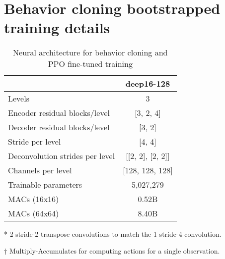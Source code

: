 \documentclass{article}
\begin{document}
\section{Behavior cloning bootstrapped training details}
\begin{table}[H]
    \centering
    \begin{threeparttable}
    \caption{Neural architecture for behavior cloning and PPO fine-tuned training}
    \label{tab:bc-architecture}
    \begin{tabular}{lc}
    \toprule
                                 & deep16-128 \\
    \midrule
    Levels                      & 3  \\
    Encoder residual blocks/level & [3, 2, 4] \\
    Decoder residual blocks/level & [3, 2] \\
    Stride per level            & [4, 4] \\
    Deconvolution strides per level & [[2, 2], [2, 2]]\tnote{*}\\
    Channels per level          & [128, 128, 128] \\
    Trainable parameters        & 5,027,279 \\
    MACs\tnote{†} (16x16)          & 0.52B \\
    MACs\tnote{†} (64x64)          & 8.40B \\
    \bottomrule
    \end{tabular}
    \begin{tablenotes}
       \item[*] 2 stride-2 transpose convolutions to match the 1 stride-4 convolution.
       \item[†] Multiply-Accumulates for computing actions for a single observation.
    \end{tablenotes}
    \end{threeparttable}
\end{table}
\end{document}
